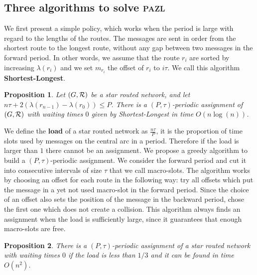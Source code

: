 \documentclass[10pt, conference, letterpaper]{IEEEtran}
\newtheorem{proposition}{Proposition}
\newcommand\pazl{\textsc{pazl}\xspace}
\begin{document}
    \subsection{Three algorithms to solve \pazl}

    We first present a simple policy, which works when the period is large with regard to the lengths of the routes.
    The messages are sent in order from the shortest route to the longest route, without any gap between two messages in the forward period.
    In other words, we assume that the route $r_i$ are sorted by increasing $\lambda(r_i)$ and we set $m_{r_i}$ the offset of $r_i$ to $i\tau$. We call this algorithm {\bf Shortest-Longest}.
    
      \begin{proposition} Let $(G, {\cal R})$ be a star routed network, and let $n\tau + 2(\lambda(r_{n-1}) - \lambda(r_{0})) \leq P$. There is a $(P,\tau)$-periodic assignment of $(G, {\cal R})$ with waiting times $0$ given by Shortest-Longest in time $O(n\log(n))$.\label{prop:SL}
      \end{proposition}

      

      We define the \textbf{load} of a star routed network as $\frac{n\tau}{P}$, it is the proportion of time slots used by messages on the central arc in a period. Therefore if the load is larger than $1$ there cannot be an assignment. We propose a greedy algorithm to build a $(P,\tau)$-periodic assignment. We consider the forward period and cut it into consecutive intervals of size $\tau$ that we call macro-slots. The algorithm works by choosing an offset for each route in the following way: try all offsets which put the message in a yet not used macro-slot in the forward  period. Since the choice of an offset also sets the position of the message in the backward period, chose the first one which does not create a collision. This algorithm always finds an assignment when the load is sufficiently large, since it guarantees that enough macro-slots are free.
      
      \begin{proposition}
    There is a $(P,\tau)$-periodic assignment of a star routed network with waiting times $0$ if the load is less than $1/3$ and it can be found in time $O(n^2)$.
    \end{proposition}
    
\end{document}
